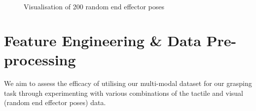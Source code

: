 \documentclass[11pt, a4paper]{report}
\begin{document}
\begin{figure}[H]%
    \centering
    \qquad
    \qquad
    \caption{Visualisation of 200 random end effector poses}%
    \label{fig:4.4}%
\end{figure}


\section{Feature Engineering \& Data Pre-processing}
\label{sec:4.4}
We aim to assess the efficacy of utilising our multi-modal dataset for our grasping task through experimenting with various combinations of the tactile and visual (random end effector poses) data.
\end{document}
